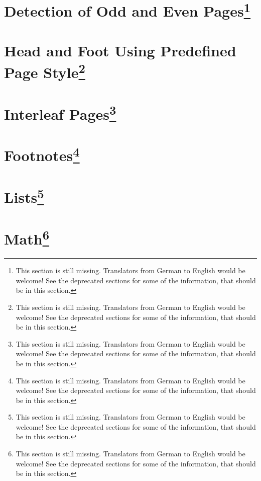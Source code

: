 \section{Detection of Odd and Even Pages\protect\footnote{This section is still missing. Translators
    from German to English would be welcome! See the deprecated sections for
    some of the information, that should be in this section.}}
\label{sec:scrlttr2.stillmissing}
\mbox{}

\section{Head and Foot Using Predefined Page Style\protect\footnote{This section is still missing. Translators
    from German to English would be welcome! See the deprecated sections for
    some of the information, that should be in this section.}}
\label{sec:scrlttr2.stillmissing}
\mbox{}

\section{Interleaf Pages\protect\footnote{This section is still missing. Translators
    from German to English would be welcome! See the deprecated sections for
    some of the information, that should be in this section.}}
\label{sec:scrlttr2.stillmissing}
\mbox{}

\section{Footnotes\protect\footnote{This section is still missing. Translators
    from German to English would be welcome! See the deprecated sections for
    some of the information, that should be in this section.}}
\label{sec:scrlttr2.stillmissing}
\mbox{}

\section{Lists\protect\footnote{This section is still missing. Translators
    from German to English would be welcome! See the deprecated sections for
    some of the information, that should be in this section.}}
\label{sec:scrlttr2.stillmissing}
\mbox{}

\section{Math\protect\footnote{This section is still missing. Translators
    from German to English would be welcome! See the deprecated sections for
    some of the information, that should be in this section.}}
\label{sec:scrlttr2.stillmissing}
\mbox{}


